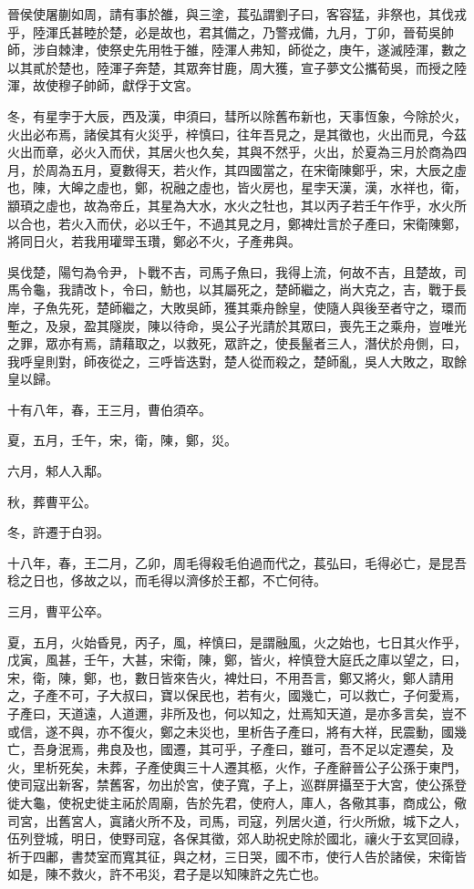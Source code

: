 \begin{pinyinscope}
晉侯使屠蒯如周，請有事於雒，與三塗，萇弘謂劉子曰，客容猛，非祭也，其伐戎乎，陸渾氏甚睦於楚，必是故也，君其備之，乃警戎備，九月，丁卯，晉荀吳帥師，涉自棘津，使祭史先用牲于雒，陸渾人弗知，師從之，庚午，遂滅陸渾，數之以其貳於楚也，陸渾子奔楚，其眾奔甘鹿，周大獲，宣子夢文公攜荀吳，而授之陸渾，故使穆子帥師，獻俘于文宮。

冬，有星孛于大辰，西及漢，申須曰，彗所以除舊布新也，天事恆象，今除於火，火出必布焉，諸侯其有火災乎，梓慎曰，往年吾見之，是其徵也，火出而見，今茲火出而章，必火入而伏，其居火也久矣，其與不然乎，火出，於夏為三月於商為四月，於周為五月，夏數得天，若火作，其四國當之，在宋衛陳鄭乎，宋，大辰之虛也，陳，大皞之虛也，鄭，祝融之虛也，皆火房也，星孛天漢，漢，水祥也，衛，顓頊之虛也，故為帝丘，其星為大水，水火之牡也，其以丙子若壬午作乎，水火所以合也，若火入而伏，必以壬午，不過其見之月，鄭裨灶言於子產曰，宋衛陳鄭，將同日火，若我用瓘斝玉瓚，鄭必不火，子產弗與。

吳伐楚，陽匄為令尹，卜戰不吉，司馬子魚曰，我得上流，何故不吉，且楚故，司馬令龜，我請改卜，令曰，魴也，以其屬死之，楚師繼之，尚大克之，吉，戰于長岸，子魚先死，楚師繼之，大敗吳師，獲其乘舟餘皇，使隨人與後至者守之，環而塹之，及泉，盈其隧炭，陳以待命，吳公子光請於其眾曰，喪先王之乘舟，豈唯光之罪，眾亦有焉，請藉取之，以救死，眾許之，使長鬣者三人，潛伏於舟側，曰，我呼皇則對，師夜從之，三呼皆迭對，楚人從而殺之，楚師亂，吳人大敗之，取餘皇以歸。

十有八年，春，王三月，曹伯須卒。

夏，五月，壬午，宋，衛，陳，鄭，災。

六月，邾人入鄅。

秋，葬曹平公。

冬，許遷于白羽。

十八年，春，王二月，乙卯，周毛得殺毛伯過而代之，萇弘曰，毛得必亡，是昆吾稔之日也，侈故之以，而毛得以濟侈於王都，不亡何待。

三月，曹平公卒。

夏，五月，火始昏見，丙子，風，梓慎曰，是謂融風，火之始也，七日其火作乎，戊寅，風甚，壬午，大甚，宋衛，陳，鄭，皆火，梓慎登大庭氏之庫以望之，曰，宋，衛，陳，鄭，也，數日皆來告火，裨灶曰，不用吾言，鄭又將火，鄭人請用之，子產不可，子大叔曰，寶以保民也，若有火，國幾亡，可以救亡，子何愛焉，子產曰，天道遠，人道邇，非所及也，何以知之，灶焉知天道，是亦多言矣，豈不或信，遂不與，亦不復火，鄭之未災也，里析告子產曰，將有大祥，民震動，國幾亡，吾身泯焉，弗良及也，國遷，其可乎，子產曰，雖可，吾不足以定遷矣，及火，里析死矣，未葬，子產使輿三十人遷其柩，火作，子產辭晉公子公孫于東門，使司寇出新客，禁舊客，勿出於宮，使子寬，子上，巡群屏攝至于大宮，使公孫登徙大龜，使祝史徙主祏於周廟，告於先君，使府人，庫人，各儆其事，商成公，儆司宮，出舊宮人，寘諸火所不及，司馬，司寇，列居火道，行火所焮，城下之人，伍列登城，明日，使野司寇，各保其徵，郊人助祝史除於國北，禳火于玄冥回祿，祈于四鄘，書焚室而寬其征，與之材，三日哭，國不市，使行人告於諸侯，宋衛皆如是，陳不救火，許不弔災，君子是以知陳許之先亡也。


\end{pinyinscope}
